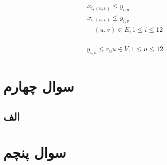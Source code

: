 \documentclass[paper=a4, fontsize=11pt]{article}
\numberwithin{equation}{section} %
\numberwithin{figure}{section} %
\numberwithin{table}{section} %
\begin{document}
\begin{align}
\begin{split}
	x_{i,(u,v)} \le y_{i,u}\\
	x_{i,(u,v)} \le y_{i,v}\\
	\quad (u,v) \in E, 1 \le i \le 12
\end{split}
\end{align}

\begin{align}
\begin{split}
	y_{i,u} \le r_u
	u \in V, 1 \le u \le 12
\end{split}
\end{align}




\section{سوال چهارم}
\subsection{الف}



\section{سوال پنچم}
\end{document}
